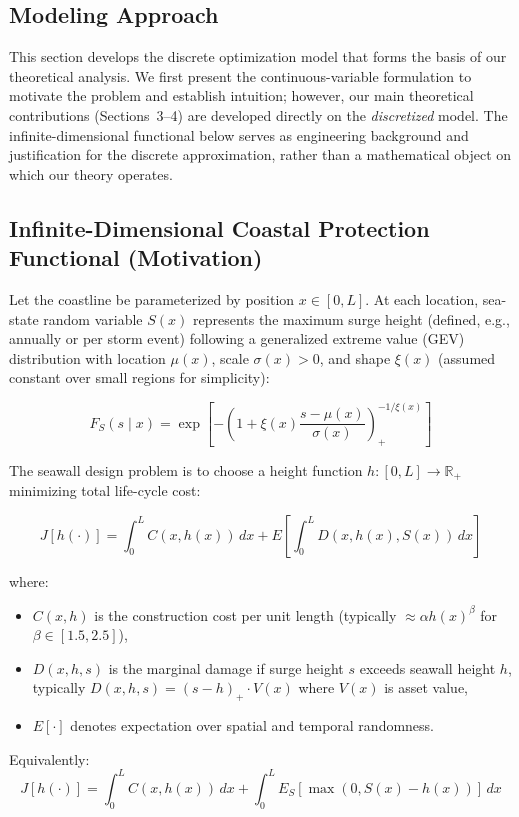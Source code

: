 \documentclass[12pt]{article}
\theoremstyle{definition}
\begin{document}
\subsection*{Modeling Approach}

This section develops the discrete optimization model that forms the basis of our theoretical analysis. We first present the continuous-variable formulation to motivate the problem and establish intuition; however, our main theoretical contributions (Sections~3--4) are developed directly on the \emph{discretized} model. The infinite-dimensional functional below serves as engineering background and justification for the discrete approximation, rather than a mathematical object on which our theory operates.

\subsection{Infinite-Dimensional Coastal Protection Functional (Motivation)}

Let the coastline be parameterized by position $x \in [0,L]$. At each location, sea-state random variable $S(x)$ represents the maximum surge height (defined, e.g., annually or per storm event) following a generalized extreme value (GEV) distribution with location $\mu(x)$, scale $\sigma(x)>0$, and shape $\xi(x)$ (assumed constant over small regions for simplicity):

\[
F_S(s \mid x) = \exp\left[-\left(1+\xi(x)\frac{s-\mu(x)}{\sigma(x)}\right)_+^{-1/\xi(x)}\right]
\]

The seawall design problem is to choose a height function $h:[0,L]\to\mathbb{R}_+$ minimizing total life-cycle cost:

\[
J[h(\cdot)] = \int_0^L C(x, h(x)) \, dx + E\left[\int_0^L D(x, h(x), S(x)) \, dx\right]
\]

where:
\begin{itemize}
    \item $C(x,h)$ is the construction cost per unit length (typically $\approx \alpha h(x)^\beta$ for $\beta \in [1.5, 2.5]$),
    \item $D(x,h,s)$ is the marginal damage if surge height $s$ exceeds seawall height $h$, typically $D(x,h,s) = (s-h)_+ \cdot V(x)$ where $V(x)$ is asset value,
    \item $E[\cdot]$ denotes expectation over spatial and temporal randomness.
\end{itemize}

Equivalently:
\[
J[h(\cdot)] = \int_0^L C(x, h(x)) \, dx + \int_0^L E_S\left[\max(0, S(x)-h(x))\right] \, dx
\]
\end{document}

